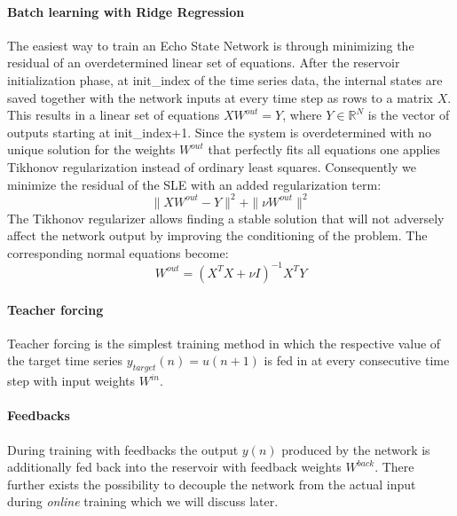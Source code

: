 \paragraph*{Batch learning with Ridge Regression}
The easiest way to train an Echo State Network is through minimizing the residual of an overdetermined linear set of equations. After the reservoir initialization phase, at init\_index of the time series data, the internal states are saved together with the network inputs at every time step as rows to a matrix $X$. This results in a linear set of equations $XW^{out}=Y$, where $Y \in \mathbb{R}^N$ is the vector of outputs starting at init\_index+1. Since the system is overdetermined with no unique solution for the weights $W^{out}$ that perfectly fits all equations one applies Tikhonov regularization instead of ordinary least squares. Consequently we minimize the residual of the SLE with an added regularization term:\\
\begin{equation}
    \|XW^{out}-Y\|^2 + \|\nu W^{out}\|^2
\end{equation}
The Tikhonov regularizer allows finding a stable solution that will not adversely affect the network output by improving the conditioning of the problem. The corresponding normal equations become:
\begin{equation}
    W^{out}=(X^TX+\nu I)^{-1} X^TY
\end{equation}

\paragraph*{Teacher forcing}
Teacher forcing is the simplest training method in which the respective value of the target time series $y_{target}(n)=u(n+1)$ is fed in at every consecutive time step with input weights $W^{in}$.

\paragraph*{Feedbacks}
During training with feedbacks the output $y(n)$ produced by the network is additionally fed back into the reservoir with feedback weights $W^{back}$. There further exists the possibility to decouple the network from the actual input during \emph{online} training which we will discuss later.

